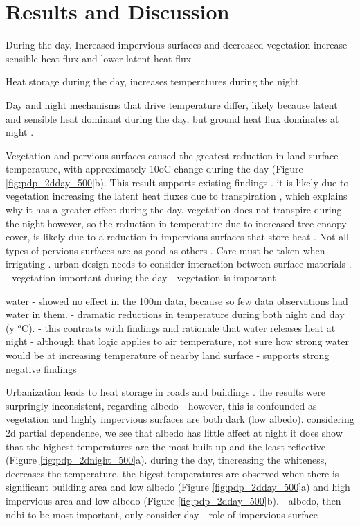 \documentclass[final,3p,times,twocolumn,sort&compress]{elsarticle}
\begin{document}
\section{Results and Discussion}

During the day, Increased impervious surfaces and decreased vegetation increase sensible heat flux and lower latent heat flux \cite{Voogt2003-mm, Peng2012-iy, Zhou2014-wc}

Heat storage during the day, increases temperatures during the night \cite{Voogt2003-mm, Zhou2014-wc}

Day and night mechanisms that drive temperature differ, likely because latent and sensible heat dominant during the day, but ground heat flux dominates at night \cite{Zhou2014-wc, Voogt2003-mm}.

Vegetation and pervious surfaces caused the greatest reduction in land surface temperature, with approximately 10oC change during the day (Figure \ref{fig:pdp_2dday_500}b). 
This result supports existing findings \cite{Zhou2014-wc, Chun2018-so}.
it is likely due to vegetation increasing the latent heat fluxes due to transpiration \cite{Zhou2014-wc}, which explains why it has a greater effect during the day. 
vegetation does not transpire during the night however, so the reduction in temperature due to increased tree cnaopy cover, is likely due to a reduction in impervious surfaces that store heat \cite{Voogt2003-mm}. 
Not all types of pervious surfaces are as good as others \cite{Gober2009-im}. Care must be taken when irrigating \cite{Gober2009-im}.
urban design needs to consider interaction between surface materials \cite{Guhathakurta2010-ib}.
- vegetation important during the day \cite{Chun2017-mm, Peng2018-cp}
- vegetation is important \cite{Wang2019-tree}

water
- showed no effect in the 100m data, because so few data observations had water in them.
- dramatic reductions in temperature during both night and day (y $^o$C).
- this contrasts with findings and rationale that water releases heat at night \cite{Chun2017-mm} - although that logic applies to air temperature, not sure how strong water would be at increasing temperature of nearby land surface
- supports strong negative findings \cite{Wang2019-water}

Urbanization leads to heat storage in roads and buildings \cite{Zhou2014-wc, Voogt2003-mm}. 
the results were surpringly inconsistent, regarding albedo - however, this is confounded as vegetation and highly impervious surfaces are both dark (low albedo).
considering 2d partial dependence, we see that albedo has little affect at night it does show that the highest temperatures are the most built up and the least reflective (Figure \ref{fig:pdp_2dnight_500}a).
during the day, tincreasing the whiteness, decreases the temperature. the higest temperatures are observed when there is significant building area and low albedo (Figure \ref{fig:pdp_2dday_500}a) and high impervious area and low albedo (Figure \ref{fig:pdp_2dday_500}b).
- albedo, then ndbi to be most important, only consider day \cite{Peng2018-cp}
- role of impervious surface \cite{Lu2006-ch}
\end{document}
